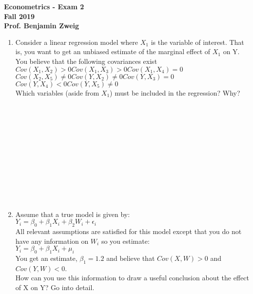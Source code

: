 \documentclass[12pt]{article}
\begin{document}
\setlength{\abovedisplayskip}{0pt}
\setlength{\belowdisplayskip}{0pt}
\setlength{\abovedisplayshortskip}{0pt}
\setlength{\belowdisplayshortskip}{0pt}

{\bf Econometrics - Exam 2}
\\
{\bf Fall 2019}
\\
{\bf Prof. Benjamin Zweig}


\begin{enumerate}[(1)]

\item Consider a linear regression model where $X_1$ is the variable of interest. That is, you want to get an unbiased estimate of the marginal effect of $X_1$ on Y. You believe that the following covariances exist\\
$Cov(X_1,X_2)>0$\qquad $Cov(X_1,X_3)>0$\qquad $Cov(X_1,X_4)=0$\\
$Cov(X_2,X_5)\neq0$\qquad $Cov(Y, X_2)\neq0$\qquad $Cov(Y,X_3)=0$\\
$Cov(Y,X_4)<0$\qquad $Cov(Y,X_5)\neq0$\\
Which variables (aside from $X_1$) must be included in the regression? Why?\\
\\
\\
\\
\\
\\
\\
\\
\\
\\
\\
\\
\item Assume that a true model is given by:\\
$Y_i = \beta_0 + \beta_1X_i + \beta_2W_i + \epsilon_i$\\
All relevant assumptions are satisfied for this model except that you do not have any information on $W_i$ so you estimate:\\
$Y_i = \beta_0 + \beta_1X_i + \mu_i$\\
You get an estimate, $\beta_1=1.2$ and believe that $Cov(X,W)>0$ and $Cov(Y,W)<0$.
\\
How can you use this information to draw a useful conclusion about the effect of X on Y? Go into detail.\\
\\
\\
\\
\\
\\

\end{enumerate}
\end{document}
